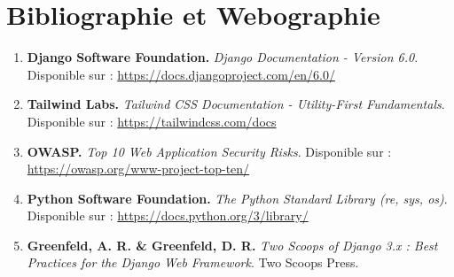 \documentclass[12pt,a4paper]{report}
\begin{document}
\newpage
\chapter*{Bibliographie et Webographie}

\begin{enumerate}
    \item \textbf{Django Software Foundation.} \textit{Django Documentation - Version 6.0}. Disponible sur : \url{https://docs.djangoproject.com/en/6.0/}
    \item \textbf{Tailwind Labs.} \textit{Tailwind CSS Documentation - Utility-First Fundamentals}. Disponible sur : \url{https://tailwindcss.com/docs}
    \item \textbf{OWASP.} \textit{Top 10 Web Application Security Risks}. Disponible sur : \url{https://owasp.org/www-project-top-ten/}
    \item \textbf{Python Software Foundation.} \textit{The Python Standard Library (re, sys, os)}. Disponible sur : \url{https://docs.python.org/3/library/}
    \item \textbf{Greenfeld, A. R. \& Greenfeld, D. R.} \textit{Two Scoops of Django 3.x : Best Practices for the Django Web Framework}. Two Scoops Press.
\end{enumerate}
\end{document}
